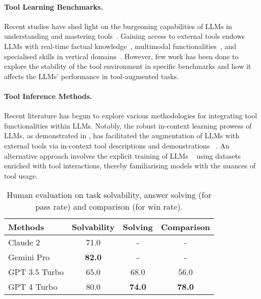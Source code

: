
\paragraph{Tool Learning Benchmarks.}
Recent studies have shed light on the burgeoning capabilities of LLMs in understanding and mastering tools~\citep{li2023apibank, patil2023gorilla, gpt4tools, song2023restgpt, tang2023toolalpaca, ye2024tooleyes, xu2023tool}.
Gaining access to external tools endows LLMs with real-time factual knowledge~\citep{yang2023chatgpt}, multimodal functionalities~\citep{gupta2023visual}, and specialised skills in vertical domains~\citep{jin2023genegpt}. 
However, few work has been done to explore the stability of the tool environment in specific benchmarks and how it affects the LLMs' performance in tool-augmented tasks. 

\paragraph{Tool Inference Methods.}
Recent literature has begun to explore various methodologies for integrating tool functionalities within LLMs. 
Notably, the robust in-context learning prowess of LLMs, as demonstrated in \cite{brown2020language}, has facilitated the augmentation of LLMs with external tools via in-context tool descriptions and demonstrations ~\citep{hsieh2023tool, ruan2023tptu, mialon2023augmented}.
An alternative approach involves the explicit training of LLMs ~\citep{patil2023gorilla, tang2023toolalpaca, chen2023fireact, qin2023toolllm, huang2023metatool} using datasets enriched with tool interactions, thereby familiarising models with the nuances of tool usage. 

\begin{table}[t!]
    \centering
    \small
    \begin{tabular}{lccc}
        \toprule
        \textbf{Methods} & \textbf{Solvability} &\textbf{Solving} & \textbf{Comparison} \\
        \midrule
         Claude 2 & 71.0 & - & -\\
         Gemini Pro & \textbf{82.0} & - & -\\
         GPT 3.5 Turbo & 65.0 & 68.0 & 56.0 \\
         GPT 4 Turbo & 80.0 & \textbf{74.0} & \textbf{78.0}\\
         
         
         \bottomrule
    \end{tabular}
    \caption{Human evaluation on task solvability, answer solving (for pass rate) and comparison (for win rate).}
    \label{tab:human_eval_task}
\end{table}

